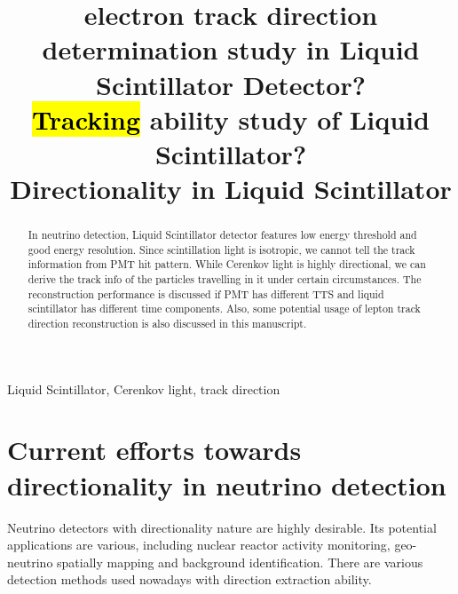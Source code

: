 \documentclass[a4paper,10pt]{cpc-hepnp}
\begin{document}
\title{electron track direction determination study in Liquid Scintillator
Detector? \\  \hl{Tracking} ability study of Liquid Scintillator?
\\
Directionality in Liquid Scintillator}

\maketitle


\begin{abstract}
In neutrino detection,
Liquid Scintillator detector features low energy threshold
and good energy resolution. Since scintillation light is isotropic,
we cannot tell the track information from PMT hit pattern.
While Cerenkov light is highly directional, we can derive the track
info of the particles travelling in it under certain circumstances.
The reconstruction performance is discussed if PMT has different TTS and
liquid scintillator has different time components. Also, some potential
usage of lepton track direction reconstruction is also discussed in this manuscript.
\end{abstract}


\begin{keyword}
Liquid Scintillator, Cerenkov light, track direction
\end{keyword}



\tableofcontents
\section{Current efforts towards directionality in neutrino detection}
Neutrino detectors with directionality nature are highly desirable.
Its potential applications are various, including nuclear reactor activity monitoring,
geo-neutrino spatially mapping and background identification.
There are various detection methods used nowadays with direction extraction
ability.
\end{document}

